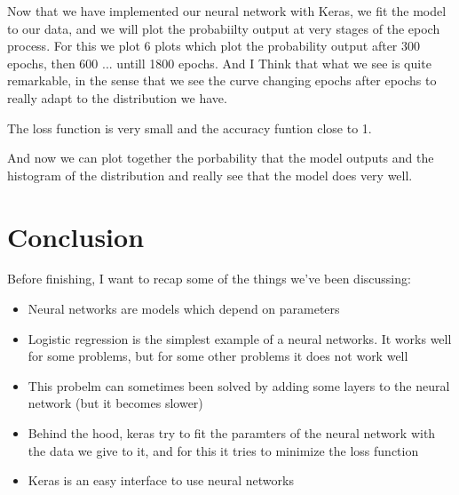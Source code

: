 \documentclass{article}
\begin{document}
Now that we have implemented our neural network with Keras, we fit the model to our data, 
and we will plot the probabiilty output at very stages of the epoch process.
For this we plot 6 plots which plot the probability output after 300 epochs, then 600 ... untill 1800 epochs.
And I Think that what we see is quite remarkable, in the sense that we see the curve changing epochs after epochs to really adapt to the distribution we have.

The loss function is very small and the accuracy funtion close to 1.

And now we can plot together the porbability that the model outputs and the histogram 
of the distribution and really see that the model does very well.

\section*{Conclusion}
Before finishing, I want to recap some of the things we've been discussing:

\begin{itemize}
\item Neural networks are models which depend on parameters 
\item Logistic regression is the simplest example of a neural networks. 
It works well for some problems, but for some other problems it does not work well
\item This probelm can sometimes been solved by adding some layers to the neural network (but it becomes slower)
\item Behind the hood, keras try to fit the paramters of the neural network with the data we give to it, 
and for this it tries to minimize the loss function
\item Keras is an easy interface to use neural networks
\end{itemize}
\end{document}
